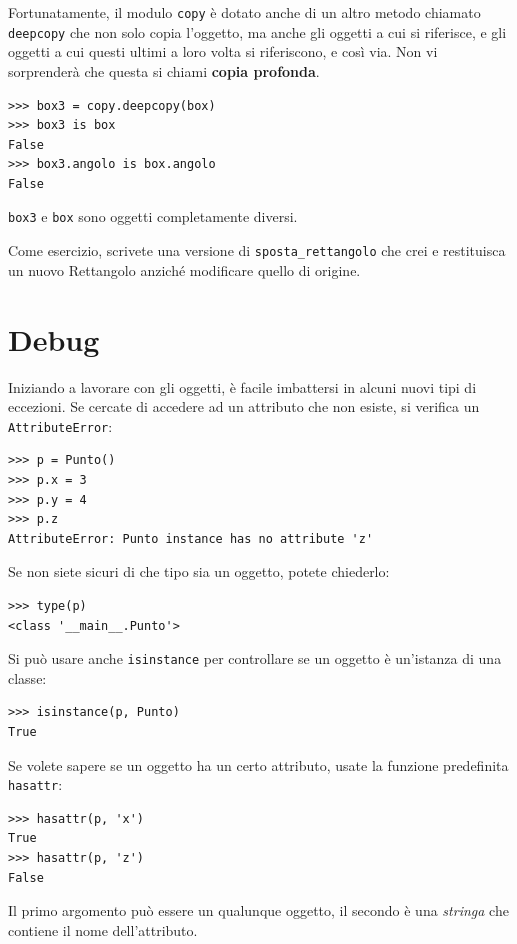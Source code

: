 \documentclass[10pt]{book}
\begin{document}
Fortunatamente, il modulo {\tt copy} è dotato anche di un altro metodo chiamato {\tt deepcopy} che non solo copia l'oggetto, ma anche gli oggetti a cui si riferisce, e gli oggetti a cui questi ultimi a loro volta si riferiscono, e così via. Non vi sorprenderà che questa si chiami {\bf copia profonda}.

\begin{verbatim}
>>> box3 = copy.deepcopy(box)
>>> box3 is box
False
>>> box3.angolo is box.angolo
False
\end{verbatim}
%
{\tt box3} e {\tt box} sono oggetti completamente diversi.

Come esercizio, scrivete una versione di \verb"sposta_rettangolo" che crei e restituisca un nuovo Rettangolo anziché modificare quello di origine.



\section{Debug}
\label{hasattr}

Iniziando a lavorare con gli oggetti, è facile imbattersi in alcuni nuovi tipi di eccezioni. Se cercate di accedere ad un attributo che non esiste, si verifica un {\tt AttributeError}:

\begin{verbatim}
>>> p = Punto()
>>> p.x = 3
>>> p.y = 4
>>> p.z
AttributeError: Punto instance has no attribute 'z'
\end{verbatim}
%
Se non siete sicuri di che tipo sia un oggetto, potete chiederlo:

\begin{verbatim}
>>> type(p)
<class '__main__.Punto'>
\end{verbatim}
%
Si può usare anche {\tt isinstance} per controllare se un oggetto è un'istanza di una classe:

\begin{verbatim}
>>> isinstance(p, Punto)
True
\end{verbatim}
%
Se volete sapere se un oggetto ha un certo attributo, usate la funzione predefinita {\tt hasattr}:

\begin{verbatim}
>>> hasattr(p, 'x')
True
>>> hasattr(p, 'z')
False
\end{verbatim}
%
Il primo argomento può essere un qualunque oggetto, il secondo è una {\em
stringa} che contiene il nome dell'attributo.
\end{document}
